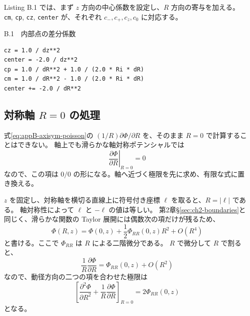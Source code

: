 Listing B.1 では、まず $z$ 方向の中心係数を設定し、$R$ 方向の寄与を加える。
\texttt{cm}, \texttt{cp}, \texttt{cz}, \texttt{center} が、それぞれ $c_-,c_+,c_z,c_0$ に対応する。

\begin{listingbox}{B.1　内部点の差分係数}
\begin{Verbatim}[fontsize=\small]
cz = 1.0 / dz**2
center = -2.0 / dz**2
cp = 1.0 / dR**2 + 1.0 / (2.0 * Ri * dR)
cm = 1.0 / dR**2 - 1.0 / (2.0 * Ri * dR)
center += -2.0 / dR**2
\end{Verbatim}
\end{listingbox}

\subsection{対称軸 $R=0$ の処理}

式\eqref{eq:appB-axisym-poisson}の $(1/R)\partial\Phi/\partial R$ を、そのまま $R=0$ で計算することはできない。
軸上でも滑らかな軸対称ポテンシャルでは
\begin{equation}
 \left.\frac{\partial\Phi}{\partial R}\right|_{R=0}=0
\label{eq:appB-axis-symmetry}
\end{equation}
なので、この項は $0/0$ の形になる。軸へ近づく極限を先に求め、有限な式に置き換える。

$z$ を固定し、対称軸を横切る直線上に符号付き座標 $\ell$ を取ると、$R=|\ell|$ である。
軸対称性によって $\ell$ と $-\ell$ の値は等しい。
第2章§\ref{sec:ch2-boundaries}と同じく、滑らかな関数の Taylor 展開には偶数次の項だけが残るため、
\begin{equation}
 \Phi(R,z)=\Phi(0,z)+\frac{1}{2}\Phi_{RR}(0,z)R^2+O(R^4)
\label{eq:appB-axis-expansion}
\end{equation}
と書ける。ここで $\Phi_{RR}$ は $R$ による二階微分である。
$R$ で微分して $R$ で割ると、
\begin{equation}
 \frac{1}{R}\frac{\partial\Phi}{\partial R}=\Phi_{RR}(0,z)+O(R^2)
\end{equation}
なので、動径方向の二つの項を合わせた極限は
\begin{equation}
 \left[\frac{\partial^2\Phi}{\partial R^2}+\frac{1}{R}\frac{\partial\Phi}{\partial R}\right]_{R=0}=2\Phi_{RR}(0,z)
\label{eq:appB-axis-limit}
\end{equation}
となる。

